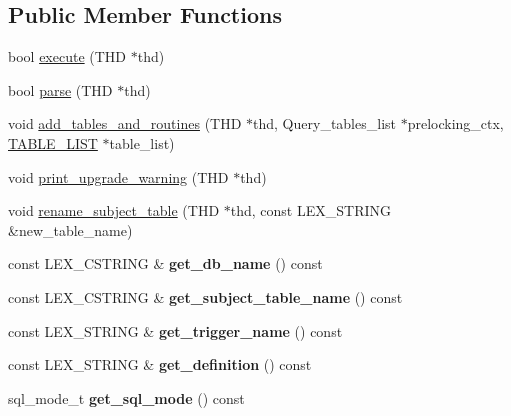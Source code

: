 \subsection*{Public Member Functions}
\begin{DoxyCompactItemize}
\item 
bool \mbox{\hyperlink{classTrigger_a7d7a8e5b4f59307e9007e968ba88e38a}{execute}} (T\+HD $\ast$thd)
\item 
bool \mbox{\hyperlink{classTrigger_a7fc5862e0b62a16f962a692af7c95e08}{parse}} (T\+HD $\ast$thd)
\item 
void \mbox{\hyperlink{classTrigger_acb8020097d27d23a3dad9e514b36ec75}{add\+\_\+tables\+\_\+and\+\_\+routines}} (T\+HD $\ast$thd, Query\+\_\+tables\+\_\+list $\ast$prelocking\+\_\+ctx, \mbox{\hyperlink{structTABLE__LIST}{T\+A\+B\+L\+E\+\_\+\+L\+I\+ST}} $\ast$table\+\_\+list)
\item 
void \mbox{\hyperlink{classTrigger_aec7f11eb254de9b0364e783d45c3066d}{print\+\_\+upgrade\+\_\+warning}} (T\+HD $\ast$thd)
\item 
void \mbox{\hyperlink{classTrigger_a021e00d7cb4a31340c06526642b2b035}{rename\+\_\+subject\+\_\+table}} (T\+HD $\ast$thd, const L\+E\+X\+\_\+\+S\+T\+R\+I\+NG \&new\+\_\+table\+\_\+name)
\item 
\mbox{\label{classTrigger_acce0609acf3296a64680971c2be6a379}} 
const L\+E\+X\+\_\+\+C\+S\+T\+R\+I\+NG \& {\bfseries get\+\_\+db\+\_\+name} () const
\item 
\mbox{\label{classTrigger_a29fbd69dc6599592951a3596fc9ef8e9}} 
const L\+E\+X\+\_\+\+C\+S\+T\+R\+I\+NG \& {\bfseries get\+\_\+subject\+\_\+table\+\_\+name} () const
\item 
\mbox{\label{classTrigger_a2f0998fc0214bb3077a93651fd4b1a68}} 
const L\+E\+X\+\_\+\+S\+T\+R\+I\+NG \& {\bfseries get\+\_\+trigger\+\_\+name} () const
\item 
\mbox{\label{classTrigger_ae3cd8691876bd40ab02a7f6b92b4f218}} 
const L\+E\+X\+\_\+\+S\+T\+R\+I\+NG \& {\bfseries get\+\_\+definition} () const
\item 
\mbox{\label{classTrigger_ab361761d2ea8a31f0701c53d7bd49b30}} 
sql\+\_\+mode\+\_\+t {\bfseries get\+\_\+sql\+\_\+mode} () const
\item 
\mbox{\label{classTrigger_ae8d18bcc2b7a3ab8ec7f5ffe96a6c7a5}} 

\end{DoxyCompactItemize}
